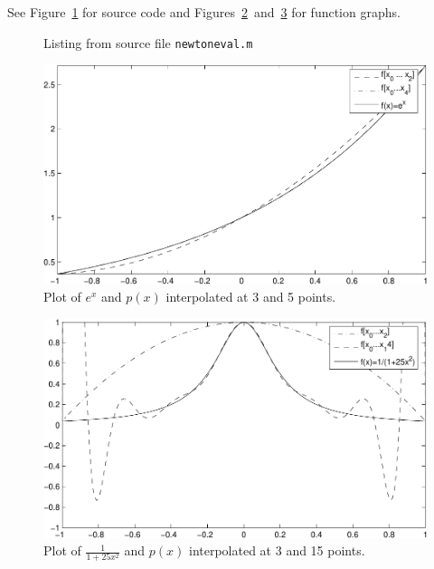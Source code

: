 \documentclass{article}
\begin{document}
 See Figure~\ref{fig:src2} for source code and Figures~\ref{fig:fx1}~and~\ref{fig:fx2} for 
function graphs.
\begin{figure}[htb]
	
	\caption{Listing from source file \texttt{newtoneval.m} }
	\label{fig:src2}
\end{figure}
\begin{figure}[htb]
	\begin{center}
		\includegraphics{newton_fx1-crop}	
	\end{center}
	\caption{Plot of $e^x$ and $p(x)$ interpolated at 3 and 5 points.}
	\label{fig:fx1}
\end{figure}
\begin{figure}[hb]
	\begin{center}
		\includegraphics{newton_fx2-crop}	
	\end{center}
	\caption{Plot of $\frac{1}{1+25x^2}$ and $p(x)$ interpolated at 3 and 15 points.}
	\label{fig:fx2}
\end{figure}
\end{document}
